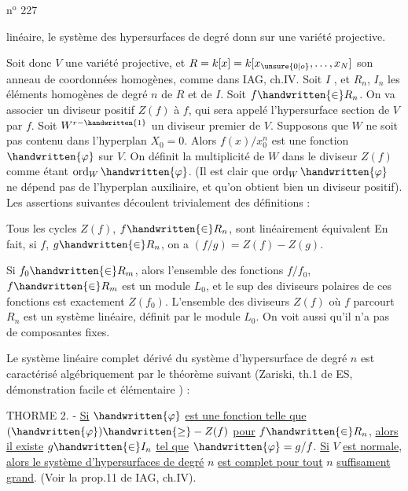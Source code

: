 n$^{\mathrm{o}}$ 227

linéaire, le système des hypersurfaces de degré donn sur une
variété projective.

Soit donc $V$ une variété projective, et $R=k[x]=k[x_{\unsure{0|o}},\ldots,x_N]$
son anneau de coordonnées homogènes, comme dans IAG, ch.IV. Soit $I$
, et $R_n$, $I_n$ les éléments homogènes de
degré $n$ de $R$ et de $I$. Soit $f\handwritten{\in}R_n$. On va associer un diviseur positif
$Z(f)$ à $f$, qui sera appelé l'hypersurface section de $V$ par $f$. Soit
$W^{r-\handwritten{1}}$ un diviseur premier de $V$. Supposons que $W$ ne soit pas contenu
dans l'hyperplan $X_0=0$. Alors $f(x)/x_0^n$ est une fonction $\handwritten{\varphi}$ sur $V$. On
définit la multiplicité de $W$ dans le diviseur $Z(f)$ comme étant
$\operatorname{ord}_W\handwritten{\varphi}$. (Il est clair que $\operatorname{ord}_W\handwritten{\varphi}$ ne dépend pas de l'hyperplan auxiliaire,
et qu'on obtient bien un diviseur positif). Les assertions
suivantes découlent trivialement des définitions :

Tous les cycles $Z(f)$, $f\handwritten{\in}R_n$, sont linéairement équivalent En
fait, si $f$, $g\handwritten{\in}R_n$, on a $(f/g)=Z(f)-Z(g)$.

Si $f_0\handwritten{\in}R_m$, alors l'ensemble des fonctions $f/f_0$, $f\handwritten{\in}R_m$ est
un module $L_0$, et le sup des diviseurs polaires de ces fonctions est
exactement $Z(f_0)$. L'ensemble des diviseurs $Z(f)$ où $f$ parcourt $R_n$ est
un système linéaire, définit par le module $L_0$. On voit aussi qu'il
n'a pas de composantes fixes.

Le système linéaire complet dérivé du système d'hypersurface
de degré $n$ est caractérisé algébriquement par le théorème suivant
(Zariski, th.1 de ES, démonstration facile et élémentaire ) :

THORME 2. - \uline{Si} $\handwritten{\varphi}$ \uline{est une fonction telle que} $(\handwritten{\varphi})\handwritten{\geq}-Z(f)$ \uline{pour}
$f\handwritten{\in}R_n$, \uline{alors il existe} $g\handwritten{\in}I_n$ \uline{tel que} $\handwritten{\varphi}=g/f$. \uline{Si} $V$ \uline{est normale},
\uline{alors le système d'hypersurfaces de degré} $n$ \uline{est complet pour tout} $n$
\uline{suffisament grand}. (Voir la prop.11 de IAG, ch.IV).
